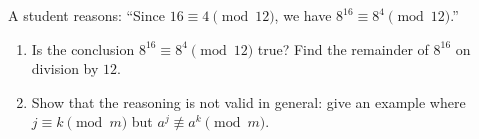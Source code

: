 A student reasons: ``Since $16\equiv4\pmod{12}$, we have $8^{16}\equiv8^4\pmod{12}$.''
\begin{enumerate}
\item[(a)] Is the conclusion $8^{16}\equiv8^4\pmod{12}$ true? Find the remainder of $8^{16}$ on division by $12$.
\item[(b)] Show that the reasoning is not valid in general: give an example where $j\equiv k\pmod m$ but $a^j\not\equiv a^k\pmod m$.
\end{enumerate}
